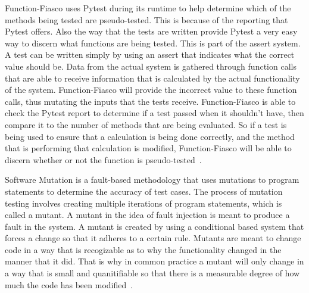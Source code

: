 Function-Fiasco uses Pytest during its runtime to help determine which of the methods being tested are pseudo-tested. This is because of the reporting that Pytest offers. Also the way that the tests are written provide Pytest a very easy way to discern what functions are being tested. This is part of the assert system. A test can be written simply by using an assert that indicates what the correct value should be. Data from the actual system is gathered through function calls that are able to receive information that is calculated by the actual functionality of the system. Function-Fiasco will provide the incorrect value to these function calls, thus mutating the inputs that the tests receive. Function-Fiasco is able to check the Pytest report to determine if a test passed when it shouldn't have, then compare it to the number of methods that are being evaluated. So if a test is being used to ensure that a calculation is being done correctly, and the method that is performing that calculation is modified, Function-Fiasco will be able to discern whether or not the function is pseudo-tested~\cite{okken_2018}.

Software Mutation is a fault-based methodology that uses mutations to program statements to determine the accuracy of test cases. The process of mutation testing involves creating multiple iterations of program statements, which is called a mutant. A mutant in the idea of fault injection is meant to produce a fault in the system. A mutant is created by using a conditional based system that forces a change so that it adheres to a certain rule. Mutants are meant to change code in a way that is recogizable as to why the functionality changed in the manner that it did. That is why in common practice a mutant will only change in a way that is small and quanitifiable so that there is a measurable degree of how much the code has been modified~\cite{friedman_voas_1995}.

